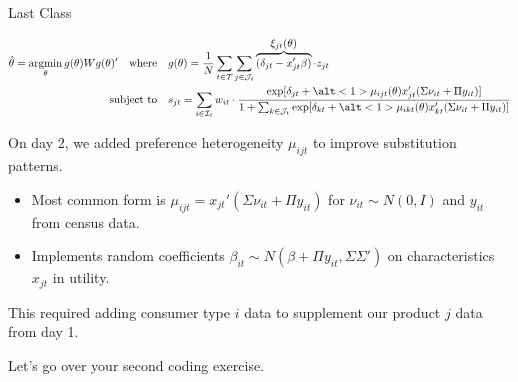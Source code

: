 \documentclass[aspectratio=169,t,11pt,table]{beamer}
\begin{document}

\begin{frame}{Last Class}
    \vspace{-2.5\baselineskip}
    \begin{minipage}[c][8\baselineskip][c]{\textwidth}
        \begin{align*}
            \hat{\theta} = \argmin_\theta g(\theta) W g(\theta)' \quad\text{where}&\quad g(\theta) = \frac{1}{N} \sum_{t \in \mathcal{T}} \sum_{j \in \mathcal{J}_t} \overbrace{(\delta_{jt} - x_{jt}'\beta)}^{\textstyle\xi_{jt}(\theta)} \cdot z_{jt} \\
            \text{subject to}&\quad s_{jt} = \sum_{i \in \mathcal{I}_t} w_{it} \cdot \frac{\exp[\delta_{jt} + \alt<1>{\mu_{ijt}(\theta)}{x_{jt}'(\Sigma\nu_{it} + \Pi y_{it})}]}{1 + \sum_{k \in \mathcal{J}_t} \exp[\delta_{kt} + \alt<1>{\mu_{ikt}(\theta)}{x_{kt}'(\Sigma\nu_{it} + \Pi y_{it})}]}
        \end{align*}
    \end{minipage}
     \vspace{-0.5\baselineskip}
    \begin{wideitemize}
        \item On day 2, we added preference heterogeneity $\mu_{ijt}$ to improve substitution patterns.
        \pause
        \begin{itemize}
            \item Most common form is $\mu_{ijt} = x_{jt}'(\Sigma\nu_{it} + \Pi y_{it})$ for $\nu_{it} \sim N(0, I)$ and $y_{it}$ from census data.
            \item Implements random coefficients $\beta_{it} \sim N(\beta + \Pi y_{it}, \Sigma\Sigma')$ on characteristics $x_{jt}$ in utility.
        \end{itemize}
        \pause
        \item This required adding consumer type $i$ data to supplement our product $j$ data from day 1.
        \pause
        \item Let's go over your second coding exercise.
    \end{wideitemize}
\end{frame}
\end{document}
